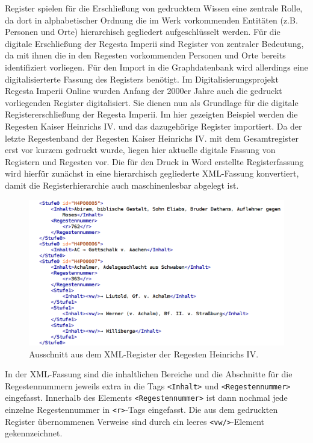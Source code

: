 \documentclass[ngerman,]{scrreprt}
\begin{document}
Register spielen für die Erschließung von gedrucktem Wissen eine zentrale Rolle, da dort in alphabetischer Ordnung die im Werk vorkommenden Entitäten (z.B. Personen und Orte) hierarchisch gegliedert aufgeschlüsselt werden. Für die digitale Erschließung der Regesta Imperii sind Register von zentraler Bedeutung, da mit ihnen die in den Regesten vorkommenden Personen und Orte bereits identifiziert vorliegen. Für den Import in die Graphdatenbank wird allerdings eine digitalisierterte Fassung des Registers benötigt. Im Digitalisierungsprojekt Regesta Imperii Online wurden Anfang der 2000er Jahre auch die gedruckt vorliegenden Register digitalisiert. Sie dienen nun als Grundlage für die digitale Registererschließung der Regesta Imperii. Im hier gezeigten Beispiel werden die Regesten Kaiser Heinrichs IV. und das dazugehörige Register importiert. Da der letzte Regestenband der Regesten Kaiser Heinrichs IV. mit dem Gesamtregister erst vor kurzem gedruckt wurde, liegen hier aktuelle digitale Fassung von Registern und Regesten vor. Die für den Druck in Word erstellte Registerfassung wird hierfür zunächst in eine hierarchisch gegliederte XML-Fassung konvertiert, damit die Registerhierarchie auch maschinenlesbar abgelegt ist.

\begin{figure}
\centering
\includegraphics{Bilder/RI2Graph/XML-Register.png}
\caption{Ausschnitt aus dem XML-Register der Regesten Heinrichs IV.}
\end{figure}

In der XML-Fassung sind die inhaltlichen Bereiche und die Abschnitte für die Regestennummern jeweils extra in die Tags \texttt{\textless{}Inhalt\textgreater{}} und \texttt{\textless{}Regestennummer\textgreater{}} eingefasst. Innerhalb des Elements \texttt{\textless{}Regestennummer\textgreater{}} ist dann nochmal jede einzelne Regestennummer in \texttt{\textless{}r\textgreater{}}-Tags eingefasst. Die aus dem gedruckten Register übernommenen Verweise sind durch ein leeres \texttt{\textless{}vw/\textgreater{}}-Element gekennzeichnet.
\end{document}
